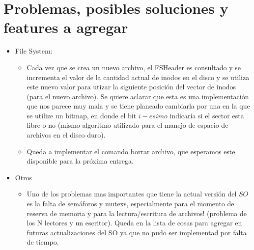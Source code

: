 \documentclass[english]{article}
\begin{document}
\section{Problemas, posibles soluciones y features a agregar}
\begin{itemize}
\item File System:

\begin{itemize}
\item Cada vez que se crea un nuevo archivo, el FSHeader es consultado y
se incrementa el valor de la cantidad actual de inodos en el disco
y se utiliza este nuevo valor para utizar la siguiente posición del
vector de inodos (para el nuevo archivo). Se quiere aclarar que esta
es una implementación que nos parece muy mala y se tiene planeado
cambiarla por una en la que se utilize un bitmap, en donde el bit
$i-esimo$ indicaría si el sector esta libre o no (mismo algoritmo
utilizado para el manejo de espacio de archivos en el disco duro). 
\item Queda a implementar el comando borrar archivo, que esperamos este disponible
para la próxima entrega.
\end{itemize}
\item Otros

\begin{itemize}
\item Uno de los problemas mas importantes que tiene la actual versión del
$SO$ es la falta de semáforos y mutexs, especialmente para el momento
de reserva de memoria y para la lectura/escritura de archivos! (problema
de los N lectores y un escritor). Queda en la lista de cosas para
agregar en futuras actualizaciones del SO ya que no pudo ser implementad
por falta de tiempo.\end{itemize}
\end{itemize}
\end{document}
